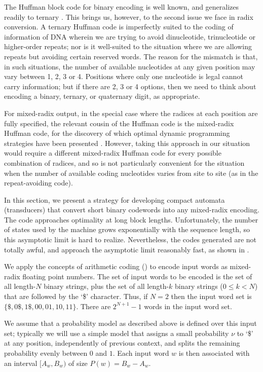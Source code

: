 \documentclass[english]{article}
\begin{document}
The Huffman block code for binary encoding is well known, and generalizes readily to ternary \cite{BornholtEtAl2016}.
This brings us, however, to the second issue we face in radix conversion.
A ternary Huffman code is imperfectly suited to the coding of information of DNA wherein we are trying to avoid dinucleotide, trinucleotide or higher-order repeats;
nor is it well-suited to the situation where we are allowing repeats but avoiding certain reserved words.
The reason for the mismatch is that, in such situations, the number of available nucleotides at any given position may vary between 1, 2, 3 or 4.
Positions where only one nucleotide is legal cannot carry information; but if there are 2, 3 or 4 options,
then we need to think about encoding a binary, ternary, or quaternary digit, as appropriate.

For mixed-radix output, in the special case where the radices at each position are fully specified,
the relevant cousin of the Huffman code is the mixed-radix Huffman code, for the discovery of which optimal dynamic programming strategies have been presented \cite{ChuGill1992,GolinEtAl2009}.
However, taking this approach in our situation would require a different mixed-radix Huffman code for every possible combination of radices,
and so is not particularly convenient for the situation when the number of available coding nucleotides varies from site to site
(as in the repeat-avoiding code).

In this section, we present a strategy for developing compact automata (transducers) that convert short binary codewords into any mixed-radix encoding.
The code approaches optimality at long block lengths.
Unfortunately, the number of states used by the machine grows exponentially with the sequence length, so this asymptotic limit is hard to realize.
Nevertheless, the codes generated are not totally awful, and approach the asymptotic limit reasonably fast,
as shown in .

We apply the concepts of arithmetic coding () to encode input words as mixed-radix floating point numbers.
The set of input words to be encoded is the set of all length-$N$ binary strings,
plus the set of all length-$k$ binary strings ($0 \leq k < N$) that are followed by the `\$' character.
Thus, if $N=2$ then the input word set is $\{\$,0\$,1\$,00,01,10,11\}$.
There are $2^{N+1}-1$ words in the input word set.

We assume that a probability model as described above is defined over this input set;
typically we will use a simple model that assigns a small probability $\nu$ to `\$' at any position,
independently of previous context,
and splits the remaining probability evenly between $0$ and $1$.
Each input word $w$ is then associated with an interval $[A_w,B_w)$ of size $P(w) = B_w-A_w$.
\end{document}
